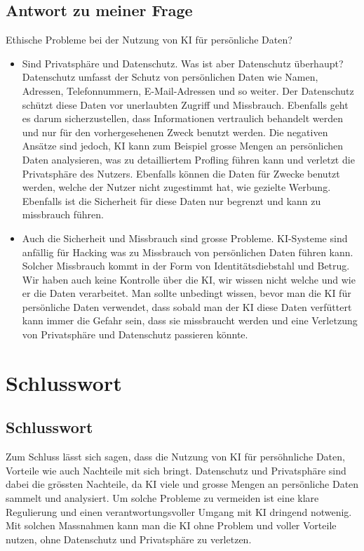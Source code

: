 \documentclass{report}
\begin{document}
\section{Antwort zu meiner Frage}
Ethische Probleme bei der Nutzung von KI für persönliche Daten?
\begin{itemize}
    \item Sind Privatsphäre und Datenschutz. Was ist aber Datenschutz überhaupt? Datenschutz umfasst der Schutz von persönlichen Daten wie Namen, Adressen, Telefonnummern, E-Mail-Adressen und so weiter. Der Datenschutz
    schützt diese Daten vor unerlaubten Zugriff und Missbrauch. Ebenfalls
    geht es darum sicherzustellen, dass Informationen vertraulich behandelt
    werden und nur für den vorhergesehenen Zweck benutzt werden. Die negativen Ansätze sind jedoch, KI kann zum Beispiel grosse Mengen an persönlichen Daten analysieren, was zu detailliertem Profling führen kann
    und verletzt die Privatsphäre des Nutzers. Ebenfalls können die Daten für
    Zwecke benutzt werden, welche der Nutzer nicht zugestimmt hat, wie gezielte Werbung. Ebenfalls ist die Sicherheit für diese Daten nur begrenzt
    und kann zu missbrauch führen. 
    \item Auch die Sicherheit und Missbrauch sind
    grosse Probleme. KI-Systeme sind anfällig für Hacking was zu Missbrauch
    von persönlichen Daten führen kann. Solcher Missbrauch kommt in der
    Form von Identitätsdiebstahl und Betrug. Wir haben auch keine Kontrolle über die KI, wir wissen nicht welche und wie er die Daten verarbeitet.
    Man sollte unbedingt wissen, bevor man die KI für persönliche Daten
    verwendet, dass sobald man der KI diese Daten verfüttert kann immer die
    Gefahr sein, dass sie missbraucht werden und eine Verletzung von Privatsphäre und Datenschutz passieren könnte.
\end{itemize}


\chapter{Schlusswort}

\section{Schlusswort}
Zum Schluss lässt sich sagen, dass die Nutzung von KI für persöhnliche Daten, Vorteile wie auch Nachteile mit sich bringt. Datenschutz und Privatsphäre sind dabei die grössten Nachteile, da KI viele und grosse Mengen an persönliche Daten sammelt und analysiert. Um solche Probleme zu vermeiden ist eine klare Regulierung  und einen verantwortungsvoller Umgang mit KI dringend notwenig. Mit solchen Massnahmen kann man die KI ohne Problem und voller Vorteile nutzen, ohne Datenschutz und Privatsphäre zu verletzen.



\nocite{*}
\printbibliography
\end{document}
